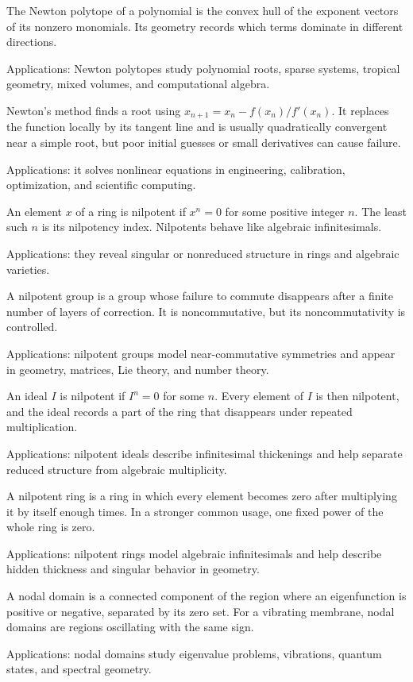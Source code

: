 The Newton polytope of a polynomial is the convex hull of the exponent vectors of its nonzero monomials. Its geometry records which terms dominate in different directions. \par\noindent Applications: Newton polytopes study polynomial roots, sparse systems, tropical geometry, mixed volumes, and computational algebra.

Newton's method finds a root using $x_{n+1}=x_n-f(x_n)/f'(x_n)$. It replaces the function locally by its tangent line and is usually quadratically convergent near a simple root, but poor initial guesses or small derivatives can cause failure. \par\noindent Applications: it solves nonlinear equations in engineering, calibration, optimization, and scientific computing.

An element $x$ of a ring is nilpotent if $x^n=0$ for some positive integer $n$. The least such $n$ is its nilpotency index. Nilpotents behave like algebraic infinitesimals. \par\noindent Applications: they reveal singular or nonreduced structure in rings and algebraic varieties.

A nilpotent group is a group whose failure to commute disappears after a finite number of layers of correction. It is noncommutative, but its noncommutativity is controlled. \par\noindent Applications: nilpotent groups model near-commutative symmetries and appear in geometry, matrices, Lie theory, and number theory.

An ideal $I$ is nilpotent if $I^n=0$ for some $n$. Every element of $I$ is then nilpotent, and the ideal records a part of the ring that disappears under repeated multiplication. \par\noindent Applications: nilpotent ideals describe infinitesimal thickenings and help separate reduced structure from algebraic multiplicity.

A nilpotent ring is a ring in which every element becomes zero after multiplying it by itself enough times. In a stronger common usage, one fixed power of the whole ring is zero. \par\noindent Applications: nilpotent rings model algebraic infinitesimals and help describe hidden thickness and singular behavior in geometry.

A nodal domain is a connected component of the region where an eigenfunction is positive or negative, separated by its zero set. For a vibrating membrane, nodal domains are regions oscillating with the same sign. \par\noindent Applications: nodal domains study eigenvalue problems, vibrations, quantum states, and spectral geometry.

